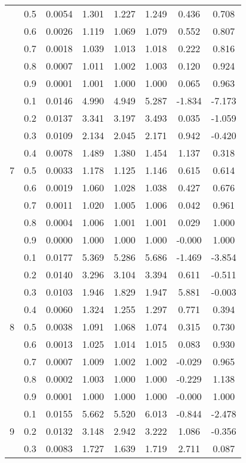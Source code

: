 \documentclass[11pt,a4paper]{report}
\begin{document}
\begin{longtable}{ | c | c || c | c | c | c | c | c | }
 & 0.5 & 0.0054 & 1.301 & 1.227 & 1.249 & 0.436 & 0.708 \\
 & 0.6 & 0.0026 & 1.119 & 1.069 & 1.079 & 0.552 & 0.807 \\
 & 0.7 & 0.0018 & 1.039 & 1.013 & 1.018 & 0.222 & 0.816 \\
 & 0.8 & 0.0007 & 1.011 & 1.002 & 1.003 & 0.120 & 0.924 \\
 & 0.9 & 0.0001 & 1.001 & 1.000 & 1.000 & 0.065 & 0.963 \\
 \hline
\multirow{9}{*}{7} & 0.1 & 0.0146 & 4.990 & 4.949 & 5.287 & -1.834 & -7.173 \\
 & 0.2 & 0.0137 & 3.341 & 3.197 & 3.493 & 0.035 & -1.059 \\
 & 0.3 & 0.0109 & 2.134 & 2.045 & 2.171 & 0.942 & -0.420 \\
 & 0.4 & 0.0078 & 1.489 & 1.380 & 1.454 & 1.137 & 0.318 \\
 & 0.5 & 0.0033 & 1.178 & 1.125 & 1.146 & 0.615 & 0.614 \\
 & 0.6 & 0.0019 & 1.060 & 1.028 & 1.038 & 0.427 & 0.676 \\
 & 0.7 & 0.0011 & 1.020 & 1.005 & 1.006 & 0.042 & 0.961 \\
 & 0.8 & 0.0004 & 1.006 & 1.001 & 1.001 & 0.029 & 1.000 \\
 & 0.9 & 0.0000 & 1.000 & 1.000 & 1.000 & -0.000 & 1.000 \\
 \hline
\multirow{9}{*}{8} & 0.1 & 0.0177 & 5.369 & 5.286 & 5.686 & -1.469 & -3.854 \\
 & 0.2 & 0.0140 & 3.296 & 3.104 & 3.394 & 0.611 & -0.511 \\
 & 0.3 & 0.0103 & 1.946 & 1.829 & 1.947 & 5.881 & -0.003 \\
 & 0.4 & 0.0060 & 1.324 & 1.255 & 1.297 & 0.771 & 0.394 \\
 & 0.5 & 0.0038 & 1.091 & 1.068 & 1.074 & 0.315 & 0.730 \\
 & 0.6 & 0.0013 & 1.025 & 1.014 & 1.015 & 0.083 & 0.930 \\
 & 0.7 & 0.0007 & 1.009 & 1.002 & 1.002 & -0.029 & 0.965 \\
 & 0.8 & 0.0002 & 1.003 & 1.000 & 1.000 & -0.229 & 1.138 \\
 & 0.9 & 0.0001 & 1.000 & 1.000 & 1.000 & -0.000 & 1.000 \\
 \hline
\multirow{9}{*}{9} & 0.1 & 0.0155 & 5.662 & 5.520 & 6.013 & -0.844 & -2.478 \\
 & 0.2 & 0.0132 & 3.148 & 2.942 & 3.222 & 1.086 & -0.356 \\
 & 0.3 & 0.0083 & 1.727 & 1.639 & 1.719 & 2.711 & 0.087 \\

\end{longtable}
\end{document}
